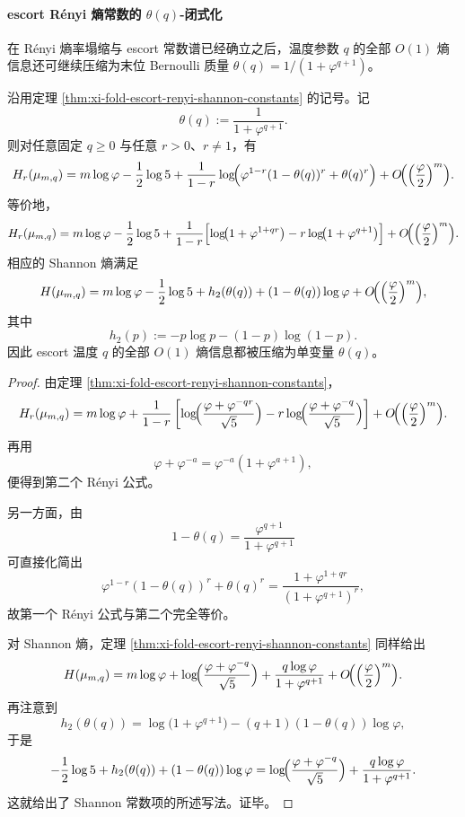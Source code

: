 \paragraph{escort Rényi 熵常数的 \texorpdfstring{$\theta(q)$}{theta(q)}-闭式化}
在 Rényi 熵率塌缩与 escort 常数谱已经确立之后，温度参数 \(q\) 的全部 \(O(1)\) 熵信息还可继续压缩为末位 Bernoulli 质量
\(
\theta(q)=1/(1+\varphi^{q+1})
\)。

\begin{theorem}\label{thm:xi-fold-escort-renyi-constant-theta-closed}
沿用定理 \ref{thm:xi-fold-escort-renyi-shannon-constants} 的记号。记
\[
\theta(q):=\frac{1}{1+\varphi^{q+1}}.
\]
则对任意固定 \(q\ge 0\) 与任意 \(r>0\)、\(r\neq 1\)，有
\[
H_r(\mu_{m,q})
=
m\log\varphi
-\frac12\log 5
+
\frac{1}{1-r}
\log\!\Bigl(
\varphi^{1-r}(1-\theta(q))^r+\theta(q)^r
\Bigr)
+
O\!\Bigl(\Bigl(\frac{\varphi}{2}\Bigr)^m\Bigr).
\]
等价地，
\[
H_r(\mu_{m,q})
=
m\log\varphi
-\frac12\log 5
+
\frac{1}{1-r}
\Bigl[
\log\!\bigl(1+\varphi^{1+qr}\bigr)
-r\log\!\bigl(1+\varphi^{q+1}\bigr)
\Bigr]
+
O\!\Bigl(\Bigl(\frac{\varphi}{2}\Bigr)^m\Bigr).
\]
相应的 Shannon 熵满足
\[
H(\mu_{m,q})
=
m\log\varphi
-\frac12\log 5
+
h_2(\theta(q))
+
(1-\theta(q))\log\varphi
+
O\!\Bigl(\Bigl(\frac{\varphi}{2}\Bigr)^m\Bigr),
\]
其中
\[
h_2(p):=-p\log p-(1-p)\log(1-p).
\]
因此 escort 温度 \(q\) 的全部 \(O(1)\) 熵信息都被压缩为单变量 \(\theta(q)\)。
\end{theorem}
\begin{proof}
由定理 \ref{thm:xi-fold-escort-renyi-shannon-constants}，
\[
H_r(\mu_{m,q})
=
m\log\varphi
+
\frac{1}{1-r}\left[
\log\!\Bigl(\frac{\varphi+\varphi^{-qr}}{\sqrt5}\Bigr)
-r\log\!\Bigl(\frac{\varphi+\varphi^{-q}}{\sqrt5}\Bigr)
\right]
+
O\!\Bigl(\Bigl(\frac{\varphi}{2}\Bigr)^m\Bigr).
\]
再用
\[
\varphi+\varphi^{-a}=\varphi^{-a}(1+\varphi^{a+1}),
\]
便得到第二个 Rényi 公式。

另一方面，由
\[
1-\theta(q)=\frac{\varphi^{q+1}}{1+\varphi^{q+1}}
\]
可直接化简出
\[
\varphi^{1-r}(1-\theta(q))^r+\theta(q)^r
=
\frac{1+\varphi^{1+qr}}{(1+\varphi^{q+1})^r},
\]
故第一个 Rényi 公式与第二个完全等价。

对 Shannon 熵，定理 \ref{thm:xi-fold-escort-renyi-shannon-constants} 同样给出
\[
H(\mu_{m,q})
=
m\log\varphi
+
\log\!\Bigl(\frac{\varphi+\varphi^{-q}}{\sqrt5}\Bigr)
+
\frac{q\log\varphi}{1+\varphi^{q+1}}
+
O\!\Bigl(\Bigl(\frac{\varphi}{2}\Bigr)^m\Bigr).
\]
再注意到
\[
h_2(\theta(q))
=
\log\!\bigl(1+\varphi^{q+1}\bigr)
-(q+1)(1-\theta(q))\log\varphi,
\]
于是
\[
-\frac12\log 5
+
h_2(\theta(q))
+
(1-\theta(q))\log\varphi
=
\log\!\Bigl(\frac{\varphi+\varphi^{-q}}{\sqrt5}\Bigr)
+
\frac{q\log\varphi}{1+\varphi^{q+1}}.
\]
这就给出了 Shannon 常数项的所述写法。证毕。
\end{proof}

\endinput
